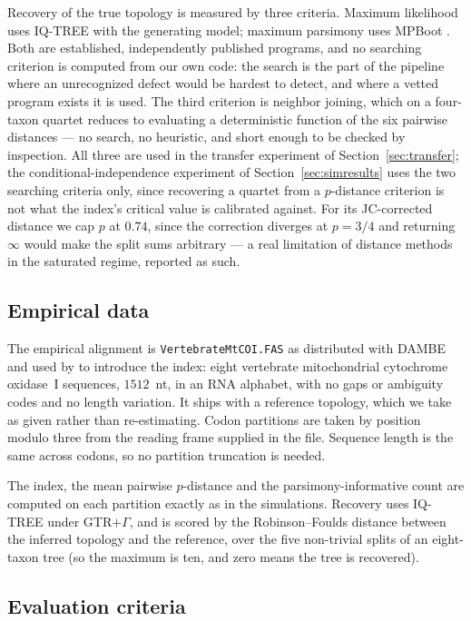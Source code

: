 \documentclass[preprint,12pt,authoryear]{elsarticle}
\theoremstyle{definition}
\theoremstyle{remark}
\begin{document}
Recovery of the true topology is measured by three criteria. Maximum
likelihood uses IQ-TREE with the generating model; maximum parsimony uses
MPBoot \citep{hoang2018mpboot}. Both are established, independently published
programs, and no searching criterion is computed from our own code: the search
is the part of the pipeline where an unrecognized defect would be hardest to
detect, and where a vetted program exists it is used. The third criterion is
neighbor joining, which on a four-taxon quartet reduces to evaluating a
deterministic function of the six pairwise distances --- no search, no
heuristic, and short enough to be checked by inspection. All three are used
in the transfer experiment of Section~\ref{sec:transfer}; the
conditional-independence experiment of Section~\ref{sec:simresults} uses the
two searching criteria only, since recovering a quartet from a
$p$-distance criterion is not what the index's critical value is calibrated
against. For its
JC-corrected distance we cap $p$ at $0.74$, since the correction diverges at
$p=3/4$ and returning $\infty$ would make the split sums arbitrary --- a real
limitation of distance methods in the saturated regime, reported as such.

\subsection{Empirical data}
\label{sec:empirical-methods}

The empirical alignment is \texttt{VertebrateMtCOI.FAS} as distributed with
DAMBE and used by \citet{xia2009handbook} to introduce the index: eight
vertebrate mitochondrial cytochrome oxidase~I sequences, $1512$~nt, in an RNA
alphabet, with no gaps or ambiguity codes and no length variation. It ships
with a reference topology, which we take as given rather than re-estimating.
Codon partitions are taken by position modulo three from the reading frame
supplied in the file. Sequence length is the same across codons, so no
partition truncation is needed.

The index, the mean pairwise $p$-distance and the parsimony-informative count
are computed on each partition exactly as in the simulations. Recovery uses
IQ-TREE \citep{minh2020iqtree2} under GTR$+\Gamma$, and is scored by the
Robinson--Foulds distance between the inferred topology and the reference,
over the five non-trivial splits of an eight-taxon tree (so the maximum is
ten, and zero means the tree is recovered).

\subsection{Evaluation criteria}
\label{sec:eval}
\end{document}
